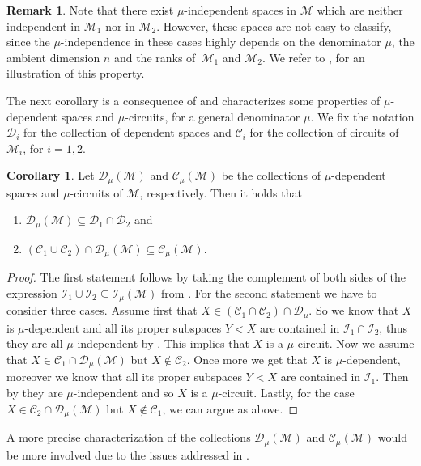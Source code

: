 \documentclass[a4paper,11pt,reqno]{amsart}
\theoremstyle{definition}
\newtheorem{remark}[theorem]{{{Remark}}}
\newtheorem{corollary}[theorem]{{{Corollary}}}%
\newcommand{\C}{\mathcal C}
\newcommand{\mD}{\mathcal{D}}
\newcommand{\mM}{\mathcal{M}}
\newcommand{\mI}{\mathcal{I}}
\begin{document}
{\begin{remark}\label{rem: mu_indep_conv_comb}
    Note that there exist $\mu$-independent spaces in $\mM$ which are neither independent in $\mM_1$ nor in $\mM_2$. However, these spaces are not easy to classify, since the $\mu$-independence in these cases highly depends on the denominator $\mu$, the ambient dimension $n$ and the ranks of~$\mM_1$ and $\mM_2$. We refer to , for an illustration of this property.
\end{remark}



The next corollary is a consequence of  and characterizes some properties of $\mu$-dependent spaces and $\mu$-circuits, for a general denominator $\mu$. We fix the notation $\mD_i$ for the collection of dependent spaces and $\C_i$ for the collection of circuits of $\mM_i$, for $i=1,2$.

\begin{corollary}
    Let $\mD_\mu(\mM)$ and $\C_\mu(\mM)$ be the collections of $\mu$-dependent spaces and $\mu$-circuits of $\mM$, respectively. Then it holds that
    \begin{enumerate}
        \item $\mD_\mu(\mM)\subseteq\mD_1\cap\mD_2$ and
        \item $(\C_1\cup\C_2)\cap\mD_\mu(\mM)\subseteq\C_\mu(\mM)$.
    \end{enumerate}
\end{corollary}
\begin{proof}
    The first statement follows by taking the complement of both sides of the expression $\mI_1\cup\mI_2\subseteq\mI_\mu(\mM)$ from . For the second statement we have to consider three cases. Assume first that $X\in(\C_1\cap\C_2)\cap\mD_\mu$. So we know that $X$ is $\mu$-dependent and all its proper subspaces $Y<X$ are contained in $\mI_1\cap\mI_2$, thus they are all $\mu$-independent by . This implies that $X$ is a $\mu$-circuit. Now we assume that $X\in\C_1\cap\mD_\mu(\mM)$ but $X\not\in\C_2$. Once more we get that $X$ is $\mu$-dependent, moreover we know that all its proper subspaces $Y<X$ are contained in $\mI_1$. Then by  they are $\mu$-independent and so $X$ is a $\mu$-circuit. Lastly, for the case $X\in\C_2\cap\mD_\mu(\mM)$ but $X\not\in\C_1$, we can argue as above.
\end{proof}

A more precise characterization of the collections $\mD_\mu(\mM)$ and $\C_\mu(\mM)$ would be more involved due to the issues addressed in .


}
\end{document}
